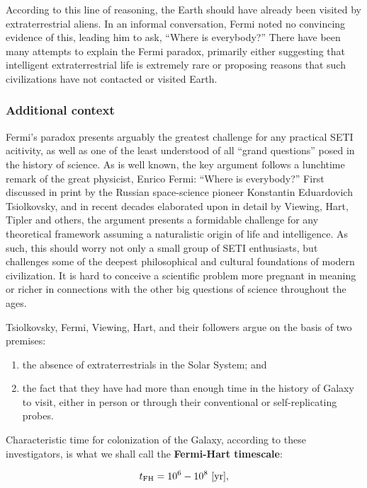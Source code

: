 \documentclass[a4paper,10pt]{article}
\begin{document}
{\noindent}According to this line of reasoning, the Earth should have already been visited by extraterrestrial aliens. In an informal conversation, Fermi noted no convincing evidence of this, leading him to ask, ``Where is everybody?'' There have been many attempts to explain the Fermi paradox, primarily either suggesting that intelligent extraterrestrial life is extremely rare or proposing reasons that such civilizations have not contacted or visited Earth.

\subsubsection{Additional context}

Fermi's paradox presents arguably the greatest challenge for any practical SETI acitivity, as well as one of the least understood of all ``grand questions'' posed in the history of science. As is well known, the key argument follows a lunchtime remark of the great physicist, Enrico Fermi: ``Where is everybody?'' First discussed in print by the Russian space-science pioneer Konstantin Eduardovich Tsiolkovsky, and in recent decades elaborated upon in detail by Viewing, Hart, Tipler and others, the argument presents a formidable challenge for any theoretical framework assuming a naturalistic origin of life and intelligence. As such, this should worry not only a small group of SETI enthusiasts, but challenges some of the deepest philosophical and cultural foundations of modern civilization. It is hard to conceive a scientific problem more pregnant in meaning or richer in connections with the other big questions of science throughout the ages.

{\noindent}Tsiolkovsky, Fermi, Viewing, Hart, and their followers argue on the basis of two premises:

\begin{enumerate}
    \item the absence of extraterrestrials in the Solar System; and
    \item the fact that they have had more than enough time in the history of Galaxy to visit, either in person or through their conventional or self-replicating probes.
\end{enumerate}

{\noindent}Characteristic time for colonization of the Galaxy, according to these investigators, is what we shall call the \textbf{Fermi-Hart timescale}:

\begin{align*}
    t_{\rm FH} = 10^6 - 10^8 ~ [{\rm yr}],
\end{align*}
\end{document}
